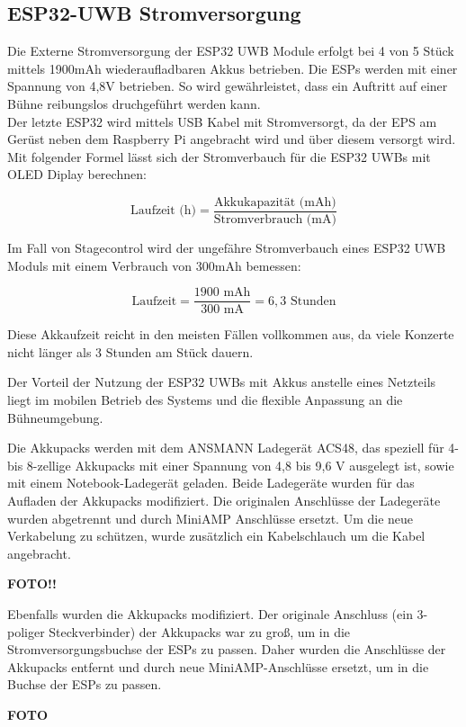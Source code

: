 \subsection{ESP32-UWB Stromversorgung}
Die Externe Stromversorgung der ESP32 UWB Module erfolgt bei 4 von 5 Stück mittels 1900mAh wiederaufladbaren Akkus betrieben. Die ESPs werden mit einer Spannung von 4,8V betrieben. So wird gewährleistet, dass ein Auftritt auf einer Bühne reibungslos druchgeführt werden kann.\\
Der letzte ESP32 wird mittels USB Kabel mit Stromversorgt, da der EPS am Gerüst neben dem Raspberry Pi angebracht wird und über diesem versorgt wird.\\

Mit folgender Formel lässt sich der Stromverbauch für die ESP32 UWBs mit OLED Diplay berechnen:

\[
\text{Laufzeit (h)} = \frac{\text{Akkukapazität (mAh)}}{\text{Stromverbrauch (mA)}}
\]

Im Fall von Stagecontrol wird der ungefähre Stromverbauch eines ESP32 UWB Moduls mit einem Verbrauch von 300mAh bemessen:

\[
\text{Laufzeit} = \frac{1900 \text{ mAh}}{300 \text{ mA}} = 6,3 \text{ Stunden}
\]

Diese Akkaufzeit reicht in den meisten Fällen vollkommen aus, da viele Konzerte nicht länger als 3 Stunden am Stück dauern.

Der Vorteil der Nutzung der ESP32 UWBs mit Akkus anstelle eines Netzteils liegt im mobilen Betrieb des Systems und die flexible Anpassung an die Bühneumgebung.

Die Akkupacks werden mit dem ANSMANN Ladegerät ACS48, das speziell für 4- bis 8-zellige Akkupacks mit einer Spannung von 4,8 bis 9,6 V ausgelegt ist, sowie mit einem Notebook-Ladegerät geladen. Beide Ladegeräte wurden für das Aufladen der Akkupacks modifiziert. Die originalen Anschlüsse der Ladegeräte wurden abgetrennt und durch MiniAMP Anschlüsse ersetzt. Um die neue Verkabelung zu schützen, wurde zusätzlich ein Kabelschlauch um die Kabel angebracht.  

\textbf{FOTO!!}

Ebenfalls wurden die Akkupacks modifiziert. Der originale Anschluss (ein 3-poliger Steckverbinder) der Akkupacks war zu groß, um in die Stromversorgungsbuchse der ESPs zu passen. Daher wurden die Anschlüsse der Akkupacks entfernt und durch neue MiniAMP-Anschlüsse ersetzt, um in die Buchse der ESPs zu passen.

\textbf{FOTO}

